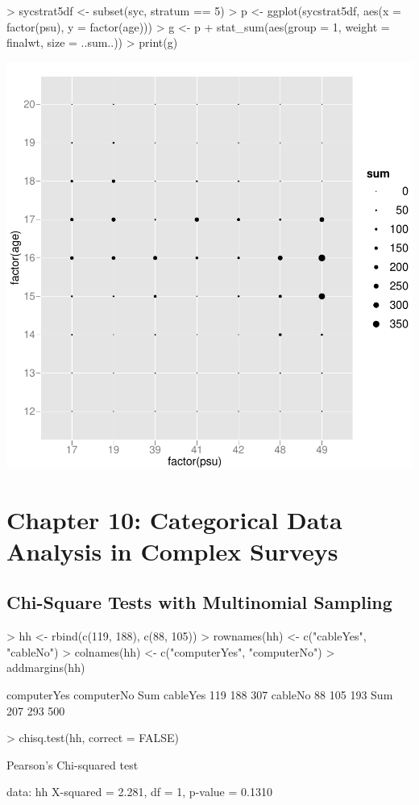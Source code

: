 \documentclass[article, 11pt, oneside]{memoir}
\begin{document}
\begin{Schunk}
\begin{Sinput}
> sycstrat5df <- subset(syc, stratum == 5)
> p <- ggplot(sycstrat5df, aes(x = factor(psu), y = factor(age)))
> g <- p + stat_sum(aes(group = 1, weight = finalwt, size = ..sum..))
> print(g)
\end{Sinput}
\end{Schunk}
\includegraphics{SDA_using_survey-017}



\chapter{Chapter 10: Categorical Data Analysis in Complex Surveys}

\section{Chi-Square Tests with Multinomial Sampling}

\begin{Schunk}
\begin{Sinput}
> hh <- rbind(c(119, 188), c(88, 105))
> rownames(hh) <- c("cableYes", "cableNo")
> colnames(hh) <- c("computerYes", "computerNo")
> addmargins(hh)
\end{Sinput}
\begin{Soutput}
         computerYes computerNo Sum
cableYes         119        188 307
cableNo           88        105 193
Sum              207        293 500
\end{Soutput}
\begin{Sinput}
> chisq.test(hh, correct = FALSE)
\end{Sinput}
\begin{Soutput}
	Pearson's Chi-squared test

data:  hh 
X-squared = 2.281, df = 1, p-value = 0.1310
\end{Soutput}
\end{Schunk}
\end{document}
